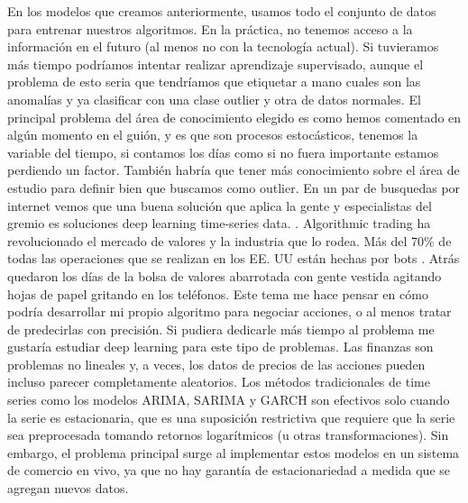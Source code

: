 \documentclass[12pt,twoside]{report}
\begin{document}
En los modelos que creamos anteriormente, usamos todo el conjunto de datos para entrenar nuestros algoritmos. En la práctica, no tenemos acceso a la información en el futuro (al menos no con la tecnología actual). Si tuvieramos más tiempo podríamos intentar realizar aprendizaje supervisado, aunque el problema de esto seria que tendríamos que etiquetar a mano cuales son las anomalías y ya clasificar con una clase outlier y otra de datos normales. El principal problema del área de conocimiento elegido es como hemos comentado en algún momento en el guión, y es que son procesos estocásticos, tenemos la variable del tiempo, si contamos los días como si no fuera importante estamos perdiendo un factor. También habría que tener más conocimiento sobre el área de estudio para definir bien que buscamos como outlier. En un par de busquedas por internet vemos que una buena solución que aplica la gente y especialistas del gremio es soluciones deep learning time-series data. \cite{stock-market-anomalies}. Algorithmic trading ha revolucionado el mercado de valores y la industria que lo rodea. Más del 70\% de todas las operaciones que se realizan en los EE. UU están hechas por bots \cite{nn}. Atrás quedaron los días de la bolsa de valores abarrotada con gente vestida agitando hojas de papel gritando en los teléfonos.
Este tema me hace pensar en cómo podría desarrollar mi propio algoritmo para negociar acciones, o al menos tratar de predecirlas con precisión. Si pudiera dedicarle más tiempo al problema me gustaría estudiar deep learning para este tipo de problemas. Las finanzas son problemas no lineales y, a veces, los datos de precios de las acciones pueden incluso parecer completamente aleatorios. Los métodos tradicionales de time series como los modelos ARIMA, SARIMA y GARCH son efectivos solo cuando la serie es estacionaria, que es una suposición restrictiva que requiere que la serie sea preprocesada tomando retornos logarítmicos (u otras transformaciones). Sin embargo, el problema principal surge al implementar estos modelos en un sistema de comercio en vivo, ya que no hay garantía de estacionariedad a medida que se agregan nuevos datos.
\end{document}
